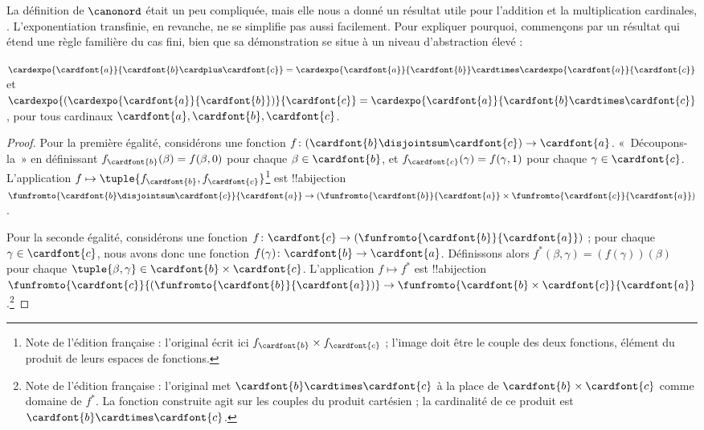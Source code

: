 \documentclass[../../../include/open-logic-section]{subfiles}
\begin{document}


La définition de $\canonord$ était un peu compliquée,
mais elle nous a donné un résultat utile pour
l'addition et la multiplication cardinales,
. L'exponentiation
transfinie, en revanche, ne se simplifie pas
aussi facilement. Pour expliquer pourquoi,
commençons par un résultat qui étend une règle
familière du cas fini, bien que sa démonstration
se situe à un niveau d'abstraction élevé :

\begin{prop}
$\cardexpo{\cardfont{a}}{\cardfont{b} \cardplus \cardfont{c}} =
\cardexpo{\cardfont{a}}{\cardfont{b}} \cardtimes
\cardexpo{\cardfont{a}}{\cardfont{c}}$ et
$\cardexpo{(\cardexpo{\cardfont{a}}{\cardfont{b}})}{\cardfont{c}} =
\cardexpo{\cardfont{a}}{\cardfont{b} \cardtimes \cardfont{c}}$,
pour tous cardinaux $\cardfont{a}, \cardfont{b},
\cardfont{c}$.
\end{prop}

\begin{proof}
Pour la première égalité, considérons une fonction
$f \colon
(\cardfont{b}\disjointsum\cardfont{c})
\to \cardfont{a}$. «~Découpons-la~» en définissant
$f_\cardfont{b}(\beta) = f(\beta, 0)$ pour
chaque $\beta \in \cardfont{b}$, et
$f_\cardfont{c}(\gamma) = f(\gamma, 1)$
pour chaque $\gamma \in \cardfont{c}$.
L'application
$f \mapsto \tuple{f_\cardfont{b},f_\cardfont{c}}$\footnote{
Note de l'édition française : l'original écrit ici
$f_\cardfont{b} \times f_\cardfont{c}$ ;
l'image doit être le couple des deux fonctions,
élément du produit de leurs espaces de fonctions.}
est !!a{bijection}
$\funfromto{\cardfont{b} \disjointsum \cardfont{c}}
{\cardfont{a}}
\to (\funfromto{\cardfont{b}}{\cardfont{a}}
\times \funfromto{\cardfont{c}}{\cardfont{a}})$.

Pour la seconde égalité, considérons une fonction
$f \colon \cardfont{c} \to
(\funfromto{\cardfont{b}}{\cardfont{a}})$ ;
pour chaque $\gamma \in \cardfont{c}$,
nous avons donc une fonction
$f(\gamma) \colon \cardfont{b} \to \cardfont{a}$.
Définissons alors
$f^*(\beta, \gamma) = (f(\gamma))(\beta)$
pour chaque
$\tuple{\beta, \gamma} \in
\cardfont{b} \times \cardfont{c}$.
L'application $f \mapsto f^*$ est
!!a{bijection}
$\funfromto{\cardfont{c}}
{(\funfromto{\cardfont{b}}{\cardfont{a}})}
\to \funfromto{\cardfont{b} \times \cardfont{c}}
{\cardfont{a}}$.\footnote{Note de l'édition
française : l'original met
$\cardfont{b}\cardtimes\cardfont{c}$
à la place de
$\cardfont{b}\times\cardfont{c}$
comme domaine de $f^*$.
La fonction construite agit sur les couples
du produit cartésien ; la cardinalité de ce
produit est
$\cardfont{b}\cardtimes\cardfont{c}$.}
\end{proof}
\end{document}
